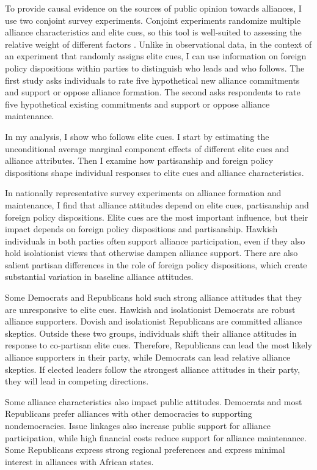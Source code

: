 \documentclass[12pt]{article}
\begin{document}
To provide causal evidence on the sources of public opinion towards alliances, I use two conjoint survey experiments.
Conjoint experiments randomize multiple alliance characteristics and elite cues, so this tool is well-suited to assessing the relative weight of different factors \citep{Hainmuelleretal2014}.
Unlike in observational data, in the context of an experiment that randomly assigns elite cues, I can use information on foreign policy dispositions within parties to distinguish who leads and who follows. 
The first study asks individuals to rate five hypothetical new alliance commitments and support or oppose alliance formation.
The second asks respondents to rate five hypothetical existing commitments and support or oppose alliance maintenance. 


In my analysis, I show who follows elite cues. 
I start by estimating the unconditional average marginal component effects of different elite cues and alliance attributes.
Then I examine how partisanship and foreign policy dispositions shape individual responses to elite cues and alliance characteristics. 


In nationally representative survey experiments on alliance formation and maintenance, I find that alliance attitudes depend on elite cues, partisanship and foreign policy dispositions. 
Elite cues are the most important influence, but their impact depends on foreign policy dispositions and partisanship. 
Hawkish individuals in both parties often support alliance participation, even if they also hold isolationist views that otherwise dampen alliance support.
There are also salient partisan differences in the role of foreign policy dispositions, which create substantial variation in baseline alliance attitudes. 


Some Democrats and Republicans hold such strong alliance attitudes that they are unresponsive to elite cues.
Hawkish and isolationist Democrats are robust alliance supporters.
Dovish and isolationist Republicans are committed alliance skeptics. 
Outside these two groups, individuals shift their alliance attitudes in response to co-partisan elite cues. 
Therefore, Republicans can lead the most likely alliance supporters in their party, while Democrats can lead relative alliance skeptics. 
If elected leaders follow the strongest alliance attitudes in their party, they will lead in competing directions. 


Some alliance characteristics also impact public attitudes. 
Democrats and most Republicans prefer alliances with other democracies to supporting nondemocracies. 
Issue linkages also increase public support for alliance participation, while high financial costs reduce support for alliance maintenance. 
Some Republicans express strong regional preferences and express minimal interest in alliances with African states. 
\end{document}
